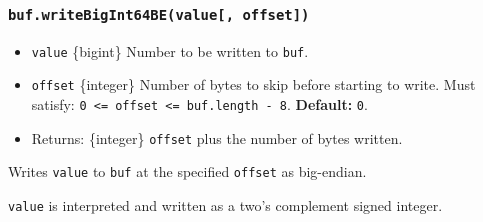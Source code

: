 \subsubsection{\texorpdfstring{\texttt{buf.writeBigInt64BE(value{[},\ offset{]})}}{buf.writeBigInt64BE(value{[}, offset{]})}}\label{buf.writebigint64bevalue-offset}

\begin{itemize}
\tightlist
\item
  \texttt{value} \{bigint\} Number to be written to \texttt{buf}.
\item
  \texttt{offset} \{integer\} Number of bytes to skip before starting to
  write. Must satisfy:
  \texttt{0\ \textless{}=\ offset\ \textless{}=\ buf.length\ -\ 8}.
  \textbf{Default:} \texttt{0}.
\item
  Returns: \{integer\} \texttt{offset} plus the number of bytes written.
\end{itemize}

Writes \texttt{value} to \texttt{buf} at the specified \texttt{offset}
as big-endian.

\texttt{value} is interpreted and written as a two's complement signed
integer.

\begin{Shaded}
\begin{Highlighting}[]
\NormalTok{ \{ }\NormalTok{ \} } \OperatorTok{;}

\OperatorTok{=} \NormalTok{(}\NormalTok{)}\OperatorTok{;}

\NormalTok{(}\OperatorTok{,} \NormalTok{)}\OperatorTok{;}

\OperatorTok{;}
\end{Highlighting}
\end{Shaded}

